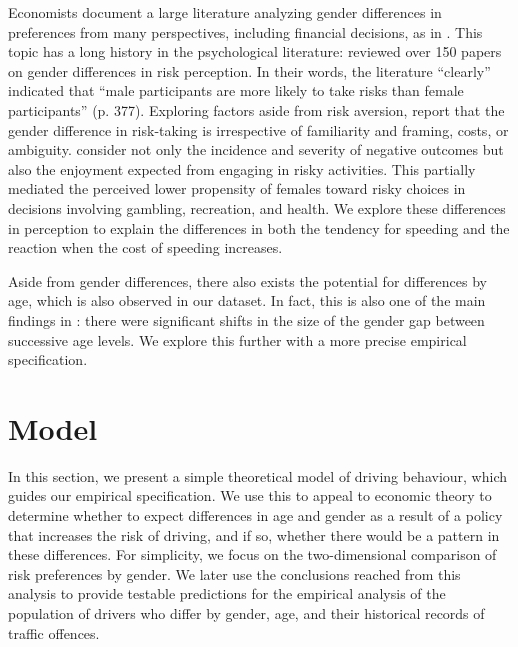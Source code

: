 \documentclass{cje}
\begin{document}
% 
Economists
\citet{crosongneezy2009}
document a large literature 
analyzing gender differences in preferences from many perspectives, 
including financial decisions, as in
\citet{charnessgneezy2012}.   
% 
This topic has a long history in the psychological literature: 
\citet{byrnes1999}
reviewed
over 150 papers on gender differences in risk perception.
In their words, the literature ``clearly'' indicated that
``male participants are more likely to take risks than female
participants'' (p. 377). 
% 
Exploring factors aside from risk aversion, 
\citet{powellansic1997} report that the gender difference in risk-taking 
is irrespective of familiarity and framing, costs, or ambiguity. 
% 
\citet{harris2006} 
consider not only the incidence and severity of
negative outcomes but also the enjoyment expected from 
engaging in risky activities. 
This 
partially mediated the perceived lower propensity of females
toward risky choices in decisions involving gambling, recreation, and health. 
We explore these differences in perception to explain 
the differences in both 
the tendency for speeding and 
the reaction when the cost of speeding increases. 


Aside from gender differences, 
there also exists the potential for differences by age, 
which is also observed in our dataset. 
%
In fact, this is also one of the main findings in 
\citet{byrnes1999}: 
there were significant shifts in the size of the gender gap between successive age levels.
% 
We explore this further with a more precise empirical specification. 



\section{Model}
\label{sec:Model}

In this section, we present a simple theoretical model of driving behaviour, 
%
which guides our empirical specification. 
%
We use this to appeal to economic theory to determine whether to expect 
differences in age and gender as a result of a policy that increases the risk of driving, 
and if so, whether there would be a pattern in these differences. 
% 
For simplicity, we focus on the two-dimensional comparison 
of risk preferences by gender. 
% 
We later use the conclusions reached from this analysis 
to provide testable predictions for the empirical analysis
of the population of drivers who differ by gender, age, 
and their historical records of traffic offences.  
\end{document}
